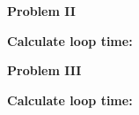 \documentclass[12pt]{article}
\begin{document}
\par
\bigskip
{\bf Problem
II
}
\par
\bigskip
{\bf Calculate loop time:}
\par


\par

\par
\bigskip
{\bf Problem
III
}

\par
\bigskip
{\bf Calculate loop time:}
\par


\par
\end{document}
